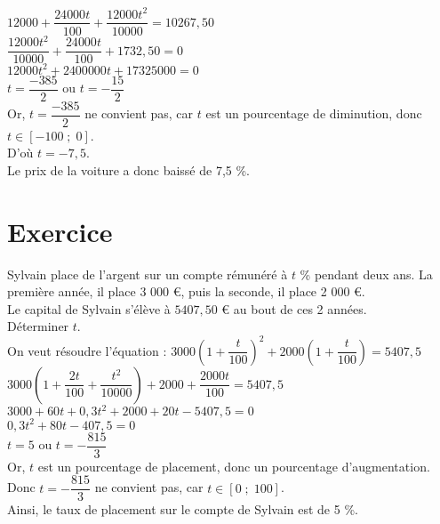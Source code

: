 $12 000 + \dfrac{24 000t}{100} + \dfrac{12 000 t^2}{10 000} = 10 267,50$ \\

$\dfrac{12 000 t^2}{10 000} + \dfrac{24 000t}{100} + 1732,50 = 0$ \\

$12 000t^2 + 2 400 000t + 17 325 000 = 0$ \\

$ t = \dfrac{-385}{2}$ ou $t = -\dfrac{15}{2}$ \\

Or, $t = \dfrac{-385}{2}$ ne convient pas, car $t$ est un pourcentage de diminution, donc $t \in \left[-100 \; ; \; 0 \right]$. \\

D'où $t = -7,5$. \\

Le prix de la voiture a donc baissé de 7,5 \%.

\newpage

\section{Exercice }

Sylvain place de l'argent sur un compte rémunéré à $t$ \% pendant deux ans. La première année, il place 3 000 €, puis la seconde, il place 2 000 €. \\
Le capital de Sylvain s'élève à $5 407,50$ € au bout de ces 2 années. \\ 
Déterminer $t$. \\ 

On veut résoudre l'équation : $3000 \left(1 + \dfrac{t}{100}\right)^2 + 2000\left(1 + \dfrac{t}{100}\right) = 5407,5$ \\

$3000 \left(1 + \dfrac{2t}{100} + \dfrac{t^2}{10000}\right) + 2000 + \dfrac{2000t}{100} = 5407,5$ \\

$3000 + 60t + 0,3t^2 + 2000 + 20t - 5407,5 = 0$ \\

$ 0,3t^2 + 80t - 407,5 = 0$ \\

$ t = 5 $ ou $t = -\dfrac{815}{3}$ \\

Or, $t$ est un pourcentage de placement, donc un pourcentage d'augmentation. \\ Donc $t = -\dfrac{815}{3}$ ne convient pas, car $t \in \left[0 \; ; \; 100 \right]$. \\

Ainsi, le taux de placement sur le compte de Sylvain est de 5 \%. 